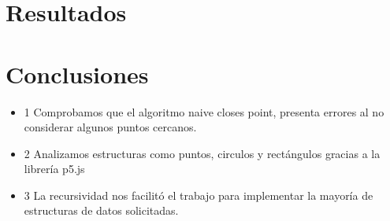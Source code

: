 \documentclass{article}
\begin{document}
\section{Resultados}



\section{Conclusiones}

\begin{itemize}
            \item 1 Comprobamos que el algoritmo naive closes point, presenta errores al no considerar algunos puntos cercanos.
\end{itemize}
\begin{itemize}
            \item 2 Analizamos estructuras como puntos, circulos y rectángulos gracias a la librería p5.js
\end{itemize}

\begin{itemize}
            \item 3 La recursividad nos facilitó el trabajo para implementar la mayoría de estructuras de datos solicitadas.
\end{itemize}  

	
	
	
\end{document}
